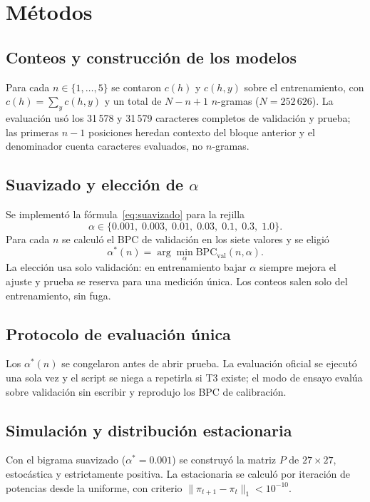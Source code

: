 \documentclass[11pt,letterpaper]{article}
\newcommand{\BPC}{\text{BPC}}
\newcommand{\Val}{\text{val}}
\begin{document}
\section{Métodos}\label{sec:metodos}

\subsection{Conteos y construcción de los modelos}

Para cada $n\in\{1,\ldots,5\}$ se contaron $c(h)$ y $c(h,y)$ sobre el entrenamiento, con $c(h)=\sum_y c(h,y)$ y un total de $N-n+1$ $n$-gramas ($N=252\,626$). La evaluación usó los 31\,578 y 31\,579 caracteres completos de validación y prueba; las primeras $n-1$ posiciones heredan contexto del bloque anterior y el denominador cuenta caracteres evaluados, no $n$-gramas.

\subsection{Suavizado y elección de $\alpha$}

Se implementó la fórmula~\eqref{eq:suavizado} para la rejilla
\[
\alpha\in\{0.001,\;0.003,\;0.01,\;0.03,\;0.1,\;0.3,\;1.0\}.
\]
Para cada $n$ se calculó el BPC de validación en los siete valores y se eligió
\[
\alpha^*(n)=\arg\min_{\alpha}\BPC_{\Val}(n,\alpha).
\]
La elección usa solo validación: en entrenamiento bajar $\alpha$ siempre mejora el ajuste y prueba se reserva para una medición única. Los conteos salen solo del entrenamiento, sin fuga.

\subsection{Protocolo de evaluación única}

Los $\alpha^*(n)$ se congelaron antes de abrir prueba. La evaluación oficial se ejecutó una sola vez y el script se niega a repetirla si T3 existe; el modo de ensayo evalúa sobre validación sin escribir y reprodujo los BPC de calibración.

\subsection{Simulación y distribución estacionaria}

Con el bigrama suavizado ($\alpha^*=0.001$) se construyó la matriz $P$ de $27\times27$, estocástica y estrictamente positiva. La estacionaria se calculó por iteración de potencias desde la uniforme, con criterio $\|\pi_{t+1}-\pi_t\|_1<10^{-10}$.
\end{document}
